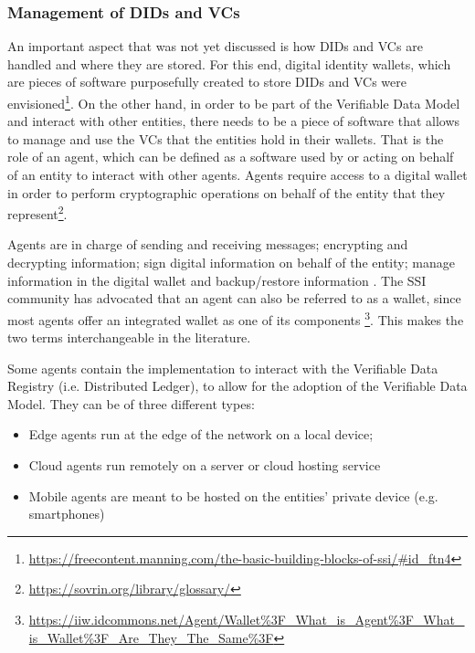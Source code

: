 \subsubsection{Management of DIDs and VCs}
\label{subsubsec:wallets_and_agents}

An important aspect that was not yet discussed is how DIDs and VCs are handled and where they are stored. For this end, digital identity wallets, which are pieces of software purposefully created to store DIDs and VCs were envisioned\footnote{\url{https://freecontent.manning.com/the-basic-building-blocks-of-ssi/\#id_ftn4}}. On the other hand, in order to be part of the Verifiable Data Model and interact with other entities, there needs to be a piece of software that allows to manage and use the VCs that the entities hold in their wallets. That is the role of an agent, which can be defined as a software used by or acting on behalf of an entity to interact with other agents. Agents require access to a digital wallet in order to perform cryptographic operations on behalf of the entity that they represent\footnote{\url{https://sovrin.org/library/glossary/}}. 

Agents are in charge of sending and receiving messages; encrypting and decrypting information; sign digital information on behalf of the entity; manage information in the digital wallet and backup/restore information \cite{SovrinIotSSI}. The SSI community has advocated that an agent can also be referred to as a wallet, since most agents offer an integrated wallet as one of its components \footnote{\url{https://iiw.idcommons.net/Agent/Wallet\%3F_What_is_Agent\%3F_What_is_Wallet\%3F_Are_They_The_Same\%3F}}. This makes the two terms interchangeable in the literature.

Some agents contain the implementation to interact with the Verifiable Data Registry (i.e. Distributed Ledger), to allow for the adoption of the Verifiable Data Model. They can be of three different types: 

\begin{itemize}
    \item Edge agents run at the edge of the network on a local device;
    \item Cloud agents run remotely on a server or cloud hosting service
    \item Mobile agents are meant to be hosted on the entities' private device (e.g. smartphones)
\end{itemize}

